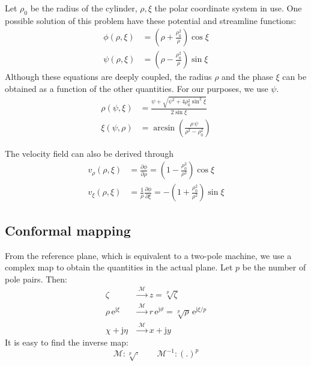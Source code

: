 \documentclass[b5paper,11pt,oneside,fleqn]{article}
\newcommand{\eu}{\mathrm{e}}
\newcommand{\je}{\mathrm{j}}
\newcommand{\te}{\vartheta}
\newcommand{\map}{\mathcal{M}}
\newcommand{\de}{\partial}
\begin{document}
Let $ \rho_0 $ be the radius of the cylinder, $ \rho,\xi $ the polar coordinate
system in use.
One possible solution of this problem have these potential and streamline
functions:
\begin{align}
\phi(\rho,\xi) &= \left( \rho + \frac{\rho_0^2}{\rho} \right) \cos\xi 
\label{eq:potential}\\[1ex]
\psi(\rho,\xi) &= \left( \rho - \frac{\rho_0^2}{\rho} \right) \sin\xi
\label{eq:streamline}
\end{align}
Although these equations are deeply coupled, the radius $ \rho $ and the phase
$ \xi $ can be obtained as a function of the other quantities.
For our purposes, we use $ \psi $.
\begin{align}
\rho(\psi,\xi) &= \frac{\psi + \sqrt{\psi^2 + 4\rho_0^2 \sin^2\xi}}{2\sin\xi}
\\[1ex]
\xi(\psi,\rho) &= \arcsin \left( \frac{\rho\, \psi}{\rho^2 - \rho_0^2} \right)
\end{align}

The velocity field can also be derived through
\begin{equation}
\begin{aligned}
v_\rho(\rho,\xi)  &= \frac{\de\phi}{\de\rho} =
           \left( 1 - \frac{\rho_0^2}{\rho^2} \right) \cos\xi \\[1ex]
v_\xi(\rho,\xi)  &= \frac{1}{\rho} \frac{\de\phi}{\de\xi}  =
          -\left( 1 + \frac{\rho_0^2}{\rho^2} \right) \sin\xi
\end{aligned}
\end{equation}




\subsection{Conformal mapping}
From the reference plane, which is equivalent to a two-pole machine,
we use a complex map to obtain the quantities in the actual plane.
Let $ p $ be the number of pole pairs. Then:
\begin{equation}
\begin{aligned}
\zeta              &\xrightarrow{\;\map\;} z = \sqrt[p]{\zeta} \\
\rho\,\eu^{\je\xi} &\xrightarrow{\;\map\;}
                       r \, \eu^{\je\te} = \sqrt[p]{\rho}\,\eu^{\je
                       \xi/p} \\
\chi + \je\eta     &\xrightarrow{\;\map\;} x + \je y
\end{aligned}
\end{equation}
%
It is easy to find the inverse map:
\begin{equation}
\map\colon \sqrt[p]{\cdot} \qquad
\map^{-1}\colon (.)^p
\end{equation}
\end{document}
